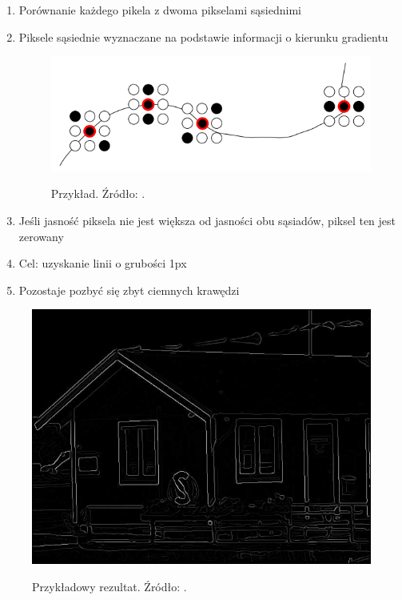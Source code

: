 \documentclass[a4paper,twocolumn,12pt]{article}
\begin{document}
\begin{enumerate}
 \item Porównanie każdego pikela z dwoma pikselami sąsiednimi
 \item Piksele sąsiednie wyznaczane na podstawie informacji o kierunku gradientu
 
  \begin{figure}[!ht]
   \begin{center}
    \scalebox{0.25}
    {
     \includegraphics{../obrazki/canny/3_1_piksele.png}
    }
   \end{center}
   \caption{
    Przykład.
    Źródło: \cite{boldak}.
   }
   \label{fig:canny_adjacent_pixels}
  \end{figure}

 \item Jeśli jasność piksela nie jest większa od jasności obu sąsiadów, piksel ten jest zerowany
 \item Cel: uzyskanie linii o grubości 1px
 \item Pozostaje pozbyć się zbyt ciemnych krawędzi
\end{enumerate}

\begin{figure}[!ht]
 \begin{center}
  \scalebox{0.25}
  {
   \includegraphics{../obrazki/canny/3_2_krawedzie.png}
  }
 \end{center}
 \caption{
  Przykładowy rezultat.
  Źródło: \cite{boldak}.
 }
 \label{fig:canny_redundant_pixels_removal}
\end{figure}
\end{document}
